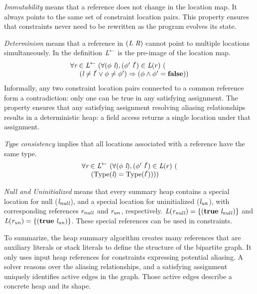 \emph{Immutability} means that a reference does not change in the
location map. It always points to the same set of constraint location
pairs. This property ensures that constraints never need to be
rewritten as the program evolves its state.

\emph{Determinism} means that a reference in $(\emph{L}\ \emph{R})$ cannot point to multiple locations simultaneously. In the definition $\emph{L}^\leftarrow$ is the pre-image of the location map.
$$
\begin{array}{l}
\forall \cfgnt{r} \in \cfgnt{L}^\leftarrow\ (\forall (\phi\ \cfgnt{l}),(\phi^\prime\ \cfgnt{l}^\prime) \in \cfgnt{L}(r)\ (\\
\ \ \ \ (\cfgnt{l} \neq \cfgnt{l}^\prime \vee \phi \neq \phi^\prime) \Rightarrow (\phi \wedge \phi^\prime = \cfgt{false}))
\end{array}
$$
Informally, any two constraint location pairs connected to a
common reference form a contradiction: only one can be true in any
satisfying assignment. The property ensures that any satisfying assignment
resolving aliasing relationships results in a deterministic heap: a
field access returns a single location under that assignment.

\emph{Type consistency} implies that all locations associated with a reference have the same type.
\[
\begin{array}{l}
\forall \cfgnt{r} \in \cfgnt{L}^\leftarrow\ (\forall (\phi\ \cfgnt{l}),(\phi^\prime\ \cfgnt{l}^\prime) \in \cfgnt{L}(r)\ (\\
\ \ \ \ (\mathrm{Type}\lp\cfgnt{l}\rp = \mathrm{Type}\lp\cfgnt{l}^\prime\rp)))
\end{array}
\]

\emph{Null and Uninitialized} means that every summary heap contains 
a special location for null ($\emph{l}_\mathit{null}$), and a special
location for uninitialized
  ($\emph{l}_\mathit{un}$), with corresponding references
  $\emph{r}_\mathit{null}$ and
  $\emph{r}_\mathit{un}$, respectively. $\emph{L}(\emph{r}_\mathit{null}) =
  \{(\textbf{true}\ \emph{l}_\mathit{null})\}$ and
  $\emph{L}(\emph{r}_\mathit{un}) =
  \{(\textbf{true}\ \emph{l}_\mathit{un})\}$. These special references can be used in constraints.

To summarize, the heap summary algorithm creates
many references that are auxiliary literals or stack literals to
define the structure of the bipartite graph.  It only uses input heap
references for constraints expressing potential aliasing. A solver
reasons over the aliasing relationships, and a satisfying assignment
uniquely identifies active edges in the graph. Those active edges
describe a concrete heap and its shape.

